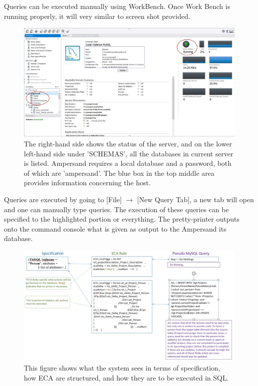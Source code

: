 Queries can be executed manually using WorkBench.
Once Work Bench is running properly, it will very 
similar to screen shot provided.
\begin{figure}[!h]
    \includegraphics[width=\textwidth]{images/WorkBench}
    \caption{\footnotesize{The right-hand side shows the status of the server, 
    and on the lower left-hand side under 'SCHEMAS', all the databases in 
    current server is listed. Ampersand requires a local database and a 
    password, both of which are 'ampersand'. The blue box in the top middle 
    area provides information concerning the host. }}
\end{figure}

Queries are executed by going to [File] $\rightarrow$ [New Query Tab], a new 
tab will open and one can manually type queries. The execution of these queries 
can be specified to the highlighted portion or everything. The pretty-printer 
outputs onto the command console what is given as output to the Ampersand its 
database. 

\begin{figure}[!h]
    \includegraphics[width=\textwidth]{images/sqlquery}
    \caption{\footnotesize{This figure shows what the system sees in terms of 
    specification, how ECA are structured, and how they are to be executed in 
    SQL. }}
\end{figure}





